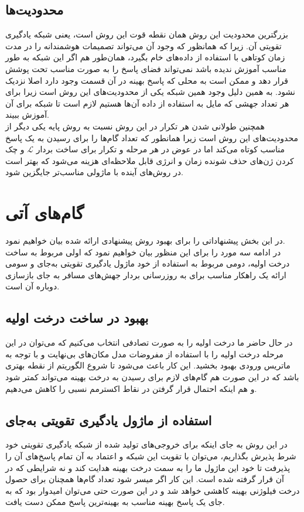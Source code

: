  \subsection{محدودیت‌ها}
  بزرگترین محدودیت این روش همان نقطه قوت این روش است، یعنی شبکه یادگیری تقویتی آن. زیرا که همانظور که وجود آن می‌تواند تصمیمات هوشمندانه را در مدت زمان کوتاهی با استفاده از داد‌ه‌های خام بگیرد، همان‌طور هم اگر این شبکه به طور مناسب آموزش ندیده باشد نمی‌تواند فضای پاسخ را به صورت مناسب تحت پوشش قرار دهد و ممکن است به محلی که پاسخ بهینه در آن قسمت وجود دارد اصلا نزدیک نشود. به همین دلیل وجود همین شبکه یکی از محدودیت‌های این روش است زیرا برای هر تعداد جهشی که مایل به استفاده از داده آن‌ها هستیم لازم است تا شبکه برای آن آموزش ببیند.
  \\
  همچنین طولانی شدن هر تکرار در این روش نسبت به روش پایه یکی دیگر از محدودیت‌های این روش است زیرا همانطور که تعداد گام‌ها را برای رسیدن به یک پاسخ مناسب کوتاه می‌کند اما در عوض در هر مرحله و تکرار برای ساخت بردار $\mathcal{L}$ و چک کردن ژن‌های حذف شونده زمان و انرژی قابل ملاحظه‌ای هزینه می‌شود که بهتر است در روش‌های آینده با ماژولی مناسب‌تر جایگزین شود.
  
  
\section{گام‌های آتی}
در این بخش پیشنهاداتی را برای بهبود روش پیشنهادی ارائه شده بیان خواهیم نمود.\\
در ادامه سه مورد را برای این منظور بیان خواهیم نمود که اولی مربوط به ساخت درخت اولیه، دومی مربوط به استفاده از خود ماژول یادگیری تقویتی به‌جای  و سومی ارائه یک راهکار مناسب برای به روزرسانی بردار جهش‌های مسافر به جای بازسازی دوباره آن است.


\subsection{بهبود در ساخت درخت اولیه}
در حال حاضر ما درخت اولیه را به صورت تصادفی انتخاب می‌کنیم که می‌توان در این مرحله درخت اولیه را با استفاده از مفروضات مدل مکان‌های بی‌نهایت و با توجه به ماتریس ورودی بهبود بخشید. این کار باعث می‌شود تا شروع الگوریتم از نقطه بهتری باشد که در این صورت هم گام‌های لازم برای رسیدن به درخت بهینه می‌تواند کمتر شود و هم اینکه احتمال قرار گرفتن در نقاط اکسترمم نسبی را کاهش می‌دهیم.


\subsection{استفاده از ماژول یادگیری تقویتی به‌جای  }
در این روش به جای اینکه برای خروجی‌های تولید شده از شبکه یادگیری تقویتی خود شرط پذیرش بگذاریم، می‌توان با تقویت این شبکه و اعتماد به آن تمام پاسخ‌های آن را پذیرفت تا خود این ماژول ما را به سمت درخت بهینه هدایت کند و نه شرایطی که در آن قرار گرفته شده است. این کار اگر میسر شود تعداد گام‌ها همچنان برای حصول درخت فیلوژنی بهینه کاهشی خواهد شد و در این صورت حتی می‌توان امیدوار بود که به جای یک پاسخ بهینه مناسب به بهینه‌ترین پاسخ ممکن دست یافت.

